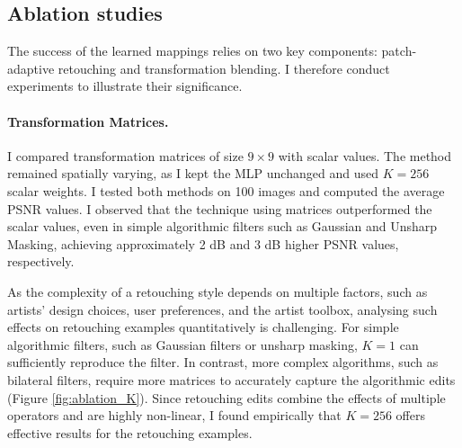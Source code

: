 \subsection{Ablation studies}\label{ablation}
The success of the learned mappings relies on two key components: patch-adaptive retouching and transformation blending. I therefore conduct experiments to illustrate their significance.

\paragraph{Transformation Matrices.} I compared transformation matrices of size $9 \times 9$ with scalar values. The method remained spatially varying, as I kept the \gls{MLP} unchanged and used $K=256$ scalar weights. I tested both methods on 100 images and computed the average \gls{PSNR} values. I observed that the technique using matrices outperformed the scalar values, even in simple algorithmic filters such as Gaussian and Unsharp Masking, achieving approximately 2 dB and 3 dB higher \gls{PSNR} values, respectively.

As the complexity of a retouching style depends on multiple factors, such as artists’ design choices, user preferences, and the artist toolbox, analysing such effects on retouching examples quantitatively is challenging. For simple algorithmic filters, such as Gaussian filters or unsharp masking, $K=1$ can sufficiently reproduce the filter. In contrast, more complex algorithms, such as bilateral filters, require more matrices to accurately capture the algorithmic edits (Figure \ref{fig:ablation_K}). Since retouching edits combine the effects of multiple operators and are highly non-linear, I found empirically that $K=256$ offers effective results for the retouching examples.


